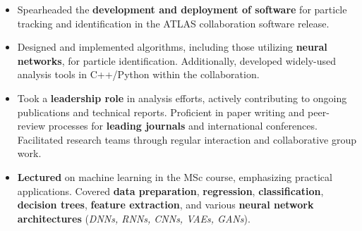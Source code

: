 \documentclass[11 pt,oneside,a4paper,titlepage]{article}
\newcommand{\hitext}[1]{\colorbox{palegray}{{#1}}}
\newcommand{\hitextbf}[1]{\colorbox{palegray}{\textbf{#1}}}
\begin{document}
        \footnotesize{
          \begin{itemize}
          \item Spearheaded the \textbf{development and deployment of software} for particle tracking and identification in the ATLAS collaboration software release.
          \item Designed and implemented algorithms, including those utilizing \textbf{neural networks}, for particle identification. Additionally, developed widely-used analysis tools in {C++/Python} within the collaboration.
          \item Took a \textbf{leadership role} in analysis efforts, actively contributing to ongoing publications and technical reports. Proficient in paper writing and peer-review processes for \textbf{leading journals} and international conferences. Facilitated research teams through regular interaction and collaborative group work.
          \item \textbf{Lectured} on machine learning in the MSc course, emphasizing practical applications. Covered \textbf{data preparation}, \textbf{regression}, \textbf{classification}, \textbf{decision trees}, \textbf{feature extraction}, and various \textbf{neural network architectures} (\emph{DNNs, RNNs, CNNs, VAEs, GANs}).
            

          \end{itemize}
        }
        \vspace*{0.22cm}                        
  
\end{document}
